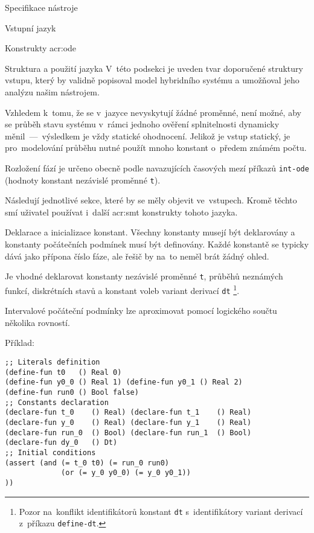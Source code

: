 \documentclass[thesis=M,czech]{FITthesis}[2012/06/26]
\newcommand{\acrlabel}[1]{acr:#1}
\newcommand{\acr}[1]{\acrshort{\acrlabel{#1}}}
\newcommand{\id}[1]{\texttt{#1}}
\begin{document}
\begin{section}{Specifikace nástroje}
\begin{subsection}{Vstupní jazyk}
\begin{subsubsection}{Konstrukty \acr{ode}}

\end{subsubsection} %


\begin{subsubsection}{Struktura a použití jazyka}
\label{sss:design:spec:ilang:struct}
V~této podsekci je uveden tvar doporučené struktury vstupu,
který by validně popisoval model hybridního systému
a umožňoval jeho analýzu našim nástrojem.

Vzhledem k~tomu, že se v~jazyce nevyskytují žádné proměnné,
není možné, aby se průběh stavu systému
v~rámci jednoho ověření splnitelnosti
dynamicky měnil~---~výsledkem je vždy statické ohodnocení.
Jelikož je vstup statický,
je pro~modelování průběhu nutné použít mnoho konstant
o~předem známém počtu.

Rozložení fází je určeno obecně
podle navazujících časových mezí příkazů \id{int-ode}
(hodnoty konstant nezávislé proměnné \id{t}).

Následují jednotlivé sekce,
které by se měly objevit ve~vstupech.
Kromě těchto smí uživatel používat
i~další \acr{smt} konstrukty tohoto jazyka.


\begin{paragraph}{Deklarace a inicializace konstant.}
\label{p:design:spec:ilang:struct:const}
Všechny konstanty musejí být deklarovány a konstanty
počátečních podmínek
musí být definovány.
Každé konstantě se typicky dává jako přípona číslo fáze,
ale řešič by na~to neměl brát žádný ohled.

Je vhodné deklarovat konstanty
nezávislé proměnné \id{t},
průběhů neznámých funkcí, diskrétních stavů
a konstant voleb variant derivací \id{dt}%
\footnote{Pozor na~konflikt identifikátorů konstant \id{dt}
s~identifikátory variant derivací
z~příkazu \id{define\--dt}.}.

Intervalové počáteční podmínky lze aproximovat
pomocí logického součtu několika rovností.

Příklad:
\begin{Verbatim}[samepage=true]
;; Literals definition
(define-fun t0   () Real 0)
(define-fun y0_0 () Real 1) (define-fun y0_1 () Real 2)
(define-fun run0 () Bool false)
;; Constants declaration
(declare-fun t_0    () Real) (declare-fun t_1    () Real)
(declare-fun y_0    () Real) (declare-fun y_1    () Real)
(declare-fun run_0  () Bool) (declare-fun run_1  () Bool)
(declare-fun dy_0   () Dt)
;; Initial conditions
(assert (and (= t_0 t0) (= run_0 run0)
             (or (= y_0 y0_0) (= y_0 y0_1))
))
\end{Verbatim}
\end{paragraph} %


\end{subsubsection}
\end{subsection}
\end{section}
\end{document}

